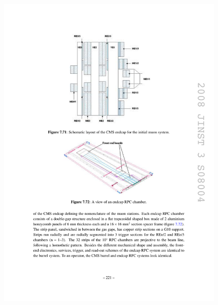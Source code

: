 \begin{figure}[hbtp]
  \begin{center}
    \includegraphics[width=\cmsFigWidth]{figures/cms-muon-RPCendcaplayout}

\end{center}
\end{figure}
